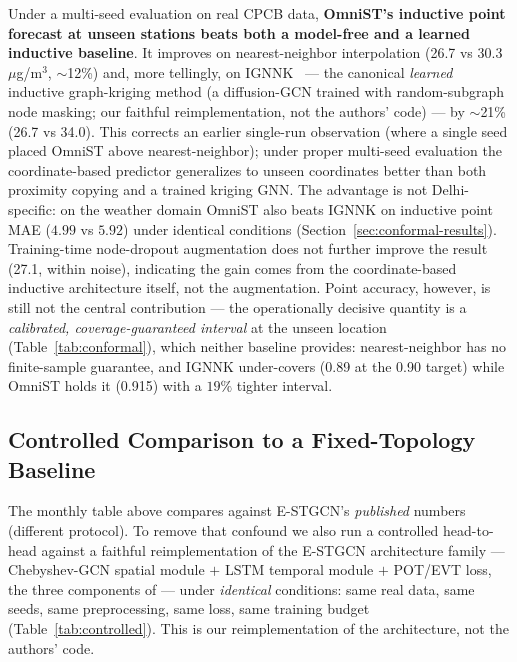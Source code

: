 \documentclass[journal]{IEEEtran}
\begin{document}
Under a multi-seed evaluation on real CPCB data, \textbf{OmniST's inductive point forecast at
unseen stations beats both a model-free and a learned inductive baseline}. It improves on
nearest-neighbor interpolation (26.7 vs 30.3~$\mu$g/m$^3$, $\sim$12\%) and, more tellingly, on
IGNNK~\cite{ignnk2020} --- the canonical \emph{learned} inductive graph-kriging method (a diffusion-GCN
trained with random-subgraph node masking; our faithful reimplementation, not the authors' code) ---
by $\sim$21\% (26.7 vs 34.0). This corrects an earlier single-run observation (where a single seed
placed OmniST above nearest-neighbor); under proper multi-seed evaluation the coordinate-based
predictor generalizes to unseen coordinates better than both proximity copying and a trained kriging
GNN. The advantage is not Delhi-specific: on the weather domain OmniST also beats IGNNK on inductive
point MAE ($4.99$ vs $5.92$) under identical conditions (Section~\ref{sec:conformal-results}).
Training-time node-dropout augmentation does not further improve the result (27.1, within noise),
indicating the gain comes from the coordinate-based inductive architecture itself, not the
augmentation. Point accuracy, however, is still not the central contribution --- the operationally
decisive quantity is a \emph{calibrated, coverage-guaranteed interval} at the unseen location
(Table~\ref{tab:conformal}), which neither baseline provides: nearest-neighbor has no finite-sample
guarantee, and IGNNK under-covers (0.89 at the 0.90 target) while OmniST holds it (0.915) with a
$19\%$ tighter interval.

\subsection{Controlled Comparison to a Fixed-Topology Baseline}
\label{sec:controlled}

The monthly table above compares against E-STGCN's \emph{published} numbers (different protocol). To
remove that confound we also run a controlled head-to-head against a faithful reimplementation of the
E-STGCN architecture family --- Chebyshev-GCN spatial module $+$ LSTM temporal module $+$ POT/EVT loss,
the three components of \cite{panja2026estgcn} --- under \emph{identical} conditions: same real data,
same seeds, same preprocessing, same loss, same training budget (Table~\ref{tab:controlled}). This is
our reimplementation of the architecture, not the authors' code.
\end{document}
